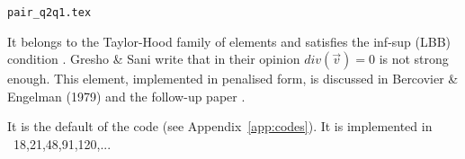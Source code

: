 \begin{flushright} {\tiny {\color{gray} \tt pair\_q2q1.tex}} \end{flushright}

\noindent
\begin{minipage}{0.48\textwidth}
\begin{center}

\end{center}
\end{minipage}
\hfill
\begin{minipage}{0.48\textwidth}
\begin{center}

\end{center}
\end{minipage}

It belongs to the Taylor-Hood family of elements and satisfies the inf-sup (LBB) condition \cite[p215]{hugh}.
Gresho \& Sani \cite[p554]{grsa} write that in their opinion $div(\vec v)=0$ is not strong enough.
This element, implemented in penalised form, is discussed in Bercovier \& Engelman (1979) \cite{been79} 
and the follow-up paper \cite{been80}. 

It is the default of the \aspect code (see Appendix~\ref{app:codes}).
It is implemented in \stone~18,21,48,91,120,...
 



